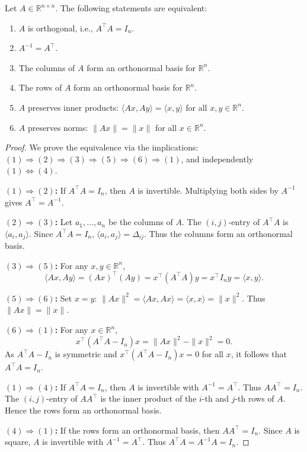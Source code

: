 \documentclass[
	11pt, %
	fleqn, %
	a4paper, %
]{LegrandOrangeBook}
\begin{document}

\begin{theorem}
Let $A \in \mathbb{R}^{n \times n}$. The following statements are equivalent:
\begin{enumerate}
    \item $A$ is orthogonal, i.e., $A^\top A = I_n$.
    \item $A^{-1} = A^\top$.
    \item The columns of $A$ form an orthonormal basis for $\mathbb{R}^n$.
    \item The rows of $A$ form an orthonormal basis for $\mathbb{R}^n$.
    \item $A$ preserves inner products: $\langle Ax, Ay \rangle = \langle x, y \rangle$ for all $x, y \in \mathbb{R}^n$.
    \item $A$ preserves norms: $\|Ax\| = \|x\|$ for all $x \in \mathbb{R}^n$.
\end{enumerate}
\end{theorem}

\begin{proof}
We prove the equivalence via the implications: \\
$(1) \Rightarrow (2) \Rightarrow (3) \Rightarrow (5) \Rightarrow (6) \Rightarrow (1)$, and independently $(1) \Leftrightarrow (4)$.

\textbf{$(1) \Rightarrow (2)$:} If $A^\top A = I_n$, then $A$ is invertible. Multiplying both sides by $A^{-1}$ gives $A^\top = A^{-1}$.

\textbf{$(2) \Rightarrow (3)$:} Let $a_1, \dots, a_n$ be the columns of $A$. The $(i,j)$-entry of $A^\top A$ is $\langle a_i, a_j \rangle$. Since $A^\top A = I_n$, $\langle a_i, a_j \rangle = \Delta_{ij}$. Thus the columns form an orthonormal basis.

\textbf{$(3) \Rightarrow (5)$:} For any $x, y \in \mathbb{R}^n$,
\[
\langle Ax, Ay \rangle = (Ax)^\top (Ay) = x^\top (A^\top A) y = x^\top I_n y = \langle x, y \rangle.
\]

\textbf{$(5) \Rightarrow (6)$:} Set $x = y$: $\|Ax\|^2 = \langle Ax, Ax \rangle = \langle x, x \rangle = \|x\|^2$. Thus $\|Ax\| = \|x\|$.

\textbf{$(6) \Rightarrow (1)$:} For any $x \in \mathbb{R}^n$,
\[
x^\top (A^\top A - I_n) x = \|Ax\|^2 - \|x\|^2 = 0.
\]
As $A^\top A - I_n$ is symmetric and $x^\top (A^\top A - I_n) x = 0$ for all $x$, it follows that $A^\top A = I_n$.

\textbf{$(1) \Rightarrow (4)$:} If $A^\top A = I_n$, then $A$ is invertible with $A^{-1} = A^\top$. Thus $A A^\top = I_n$. The $(i,j)$-entry of $A A^\top$ is the inner product of the $i$-th and $j$-th rows of $A$. Hence the rows form an orthonormal basis.

\textbf{$(4) \Rightarrow (1)$:} If the rows form an orthonormal basis, then $A A^\top = I_n$. Since $A$ is square, $A$ is invertible with $A^{-1} = A^\top$. Thus $A^\top A = A^{-1} A = I_n$.
\end{proof}
\end{document}
